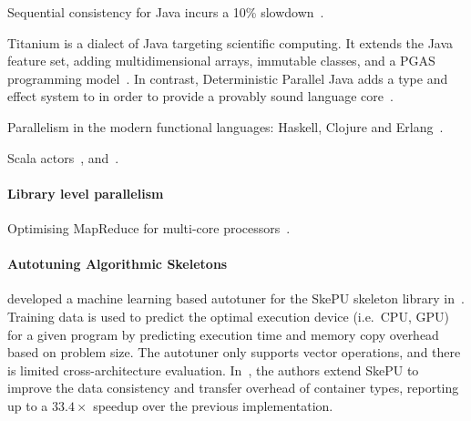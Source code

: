 Sequential consistency for Java incurs a 10\%
slowdown~\cite{Sura2005}.

Titanium is a dialect of Java targeting scientific computing. It
extends the Java feature set, adding multidimensional arrays,
immutable classes, and a PGAS programming model~\cite{Yelick1998}. In
contrast, Deterministic Parallel Java adds a type and effect system to
in order to provide a provably sound language
core~\cite{Bocchino2009}.

Parallelism in the modern functional languages: Haskell, Clojure and
Erlang~\cite{Pierro2012}.

Scala actors~\cite{Haller2009a}, and~\cite{Haller2012}.



\paragraph{Library level parallelism}

Optimising MapReduce for multi-core processors~\cite{Kaashoek2010}.









\paragraph{Autotuning Algorithmic Skeletons}
\citeauthor{Dastgeer2011} developed a machine learning based autotuner
for the SkePU skeleton library in~\cite{Dastgeer2011}. Training data
is used to predict the optimal execution device (i.e.\ CPU, GPU) for a
given program by predicting execution time and memory copy overhead
based on problem size. The autotuner only supports vector operations,
and there is limited cross-architecture
evaluation. In~\cite{Dastgeer2015a}, the authors extend SkePU to
improve the data consistency and transfer overhead of container types,
reporting up to a $33.4\times$ speedup over the previous
implementation.

